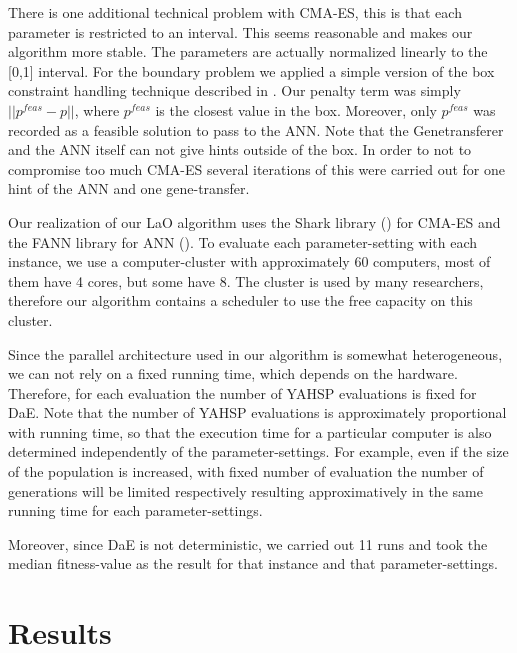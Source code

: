 \documentclass{MYsig-alternate}
\begin{document}
There is one additional technical problem with CMA-ES, this is that each parameter is restricted to an interval. This seems reasonable and makes our algorithm more stable. The parameters are actually normalized linearly to the [0,1] interval. For the boundary problem we applied a simple version of the box constraint handling technique described in \cite{hansen2009tec}. Our penalty term was simply \begin{math}||p^{feas}-p|| \end{math}, where \begin{math}p^{feas}\end{math} is the closest value in the box. Moreover, only \begin{math}p^{feas}\end{math} was recorded as a feasible solution to pass to the ANN. Note that the Genetransferer and the ANN itself can not give hints outside of the box. In order to not to compromise too much CMA-ES several iterations of this were carried out for one hint of the ANN and one gene-transfer.

Our realization of our LaO algorithm uses the Shark library (\cite{shark08}) for CMA-ES and the FANN library for ANN (\cite{nissen}). To evaluate each parameter-setting with each instance, we use a computer-cluster with approximately 60 computers, most of them have 4 cores, but some have 8. The cluster is used by many researchers, therefore our algorithm contains a scheduler to use the free capacity on this cluster.

Since the parallel architecture used in our algorithm is somewhat heterogeneous, we can not rely on a fixed running time, which depends on the hardware. Therefore, for each evaluation the number of YAHSP evaluations is fixed for DaE. Note that the number of YAHSP evaluations is approximately proportional with running time, so that the execution time for a particular computer is also determined independently of the parameter-settings. For example, even if the size of the population is increased, with fixed number of evaluation the number of generations will be limited respectively resulting approximatively in the same running time for each parameter-settings. 

Moreover, since DaE is not deterministic, we carried out 11 runs and took the median fitness-value as the result for that instance and that parameter-settings.

\section{Results}
\label{section:results}
\end{document}
